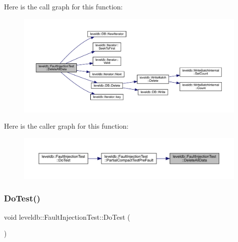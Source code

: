 Here is the call graph for this function\+:
\nopagebreak
\begin{figure}[H]
\begin{center}
\leavevmode
\includegraphics[width=350pt]{classleveldb_1_1_fault_injection_test_a6e112ba6b03957228317818c0e91fa04_cgraph}
\end{center}
\end{figure}
Here is the caller graph for this function\+:
\nopagebreak
\begin{figure}[H]
\begin{center}
\leavevmode
\includegraphics[width=350pt]{classleveldb_1_1_fault_injection_test_a6e112ba6b03957228317818c0e91fa04_icgraph}
\end{center}
\end{figure}
\mbox{\label{classleveldb_1_1_fault_injection_test_a451539e9d3eb1ba9e9f68cca5a774cdc}} 
\subsubsection{\texorpdfstring{DoTest()}{DoTest()}}
{\footnotesize\ttfamily void leveldb\+::\+Fault\+Injection\+Test\+::\+Do\+Test (\begin{DoxyParamCaption}{ }\end{DoxyParamCaption})\hspace{0.3cm}{\ttfamily [inline]}}

